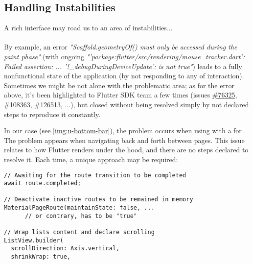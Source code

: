 
\subsection{Handling Instabilities}

A rich interface may road us to an area of instabilities...\\
\\

\noindent By example, an error \emph{"Scaffold.geometryOf() must only be accessed during the paint phase"} (with ongoing 
\emph{"'package:flutter/src/rendering/mouse\_tracker.dart': Failed assertion: ... '!\_debugDuringDeviceUpdate': 
is not true"}) leads to a fully nonfunctional state  of the application (by not responding to any of interaction).
Sometimes we might be not alone with the problematic area; as for the error above, it's been highlighted to Flutter 
SDK team a few times (issues \href{https://github.com/flutter/flutter/issues/76325}{\#76325},
\href{https://github.com/flutter/flutter/issues/108363}{\#108363}, 
\href{https://github.com/flutter/flutter/issues/126513}{\#126513}, ...), but closed without being resolved simply by 
not declared steps to reproduce it constantly.


\noindent In our case (see \cref{img:u-bottom-bar}), the problem occurs when using 
 with a  for . The problem appears when 
navigating back and forth between pages. This issue relates to how Flutter renders under the hood, and there are no 
steps declared to resolve it. Each time, a unique approach may be required:

\begin{lstlisting}
// Awaiting for the route transition to be completed
await route.completed;

// Deactivate inactive routes to be remained in memory
MaterialPageRoute(maintainState: false, ... 
      // or contrary, has to be "true"

// Wrap lists content and declare scrolling
ListView.builder(
  scrollDirection: Axis.vertical,
  shrinkWrap: true,
\end{lstlisting}

